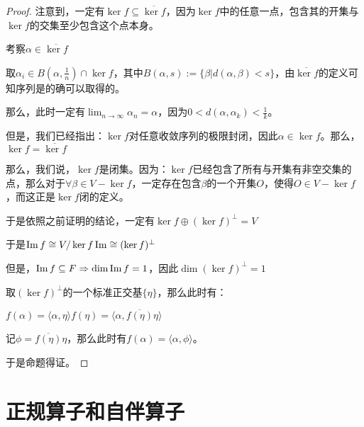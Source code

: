 \documentclass[12pt, a4paper, oneside, UTF8]{ctexbook}
\begin{document}
\begin{para}{0}
\begin{proof}
							注意到，一定有$\ker f \subseteq \overline{\ker f}$，因为$\ker f$中的任意一点，包含其的开集与$\ker f$的交集至少包含这个点本身。

							考察$\alpha \in \overline{\ker f}$

							取$\alpha_i \in B(\alpha ,\frac{1}{n}) \cap \ker f$，其中$B(\alpha ,s):=\{\beta |d(\alpha ,\beta )< s\}$，由$\overline{\ker f}$的定义可知序列是的确可以取得的。

							那么，此时一定有$\lim_{n \to \infty} \alpha_n = \alpha $，因为$0 < d(\alpha ,\alpha_k)<\frac{1}{k}$。

							但是，我们已经指出：$\ker f$对任意收敛序列的极限封闭，因此$\alpha \in \ker f$。那么，$\ker f = \overline{\ker f}$

							那么，我们说，$\ker f$是闭集。因为：$\ker f$已经包含了所有与开集有非空交集的点，那么对于$\forall \beta \in V-\ker f$，一定存在包含$\beta $的一个开集$O$，使得$O\in V-\ker f$，而这正是$\ker f$闭的定义。

							于是依照之前证明的结论，一定有$\ker f \oplus (\ker f)^{\perp} = V$

							于是$\operatorname{Im} f \cong V/\ker f \operatorname{Im} \cong (\ker f)^{\perp}$

							但是，$\operatorname{Im} f \subseteq F \Rightarrow \dim \operatorname{Im} f = 1$，因此$\dim (\ker f)^{\perp} = 1$

							取$(\ker f)^{\perp}$的一个标准正交基$\{\eta \}$，那么此时有：

							$f(\alpha )=\langle \alpha ,\eta \rangle f(\eta) =\langle \alpha ,\overline{f(\eta )}\eta \rangle$

							记$\phi = \overline{f(\eta )}\eta$，那么此时有$f(\alpha )=\langle \alpha ,\phi \rangle$。

							于是命题得证。
						\end{proof}
			\end{para}
	\section{正规算子和自伴算子}
\end{document}

